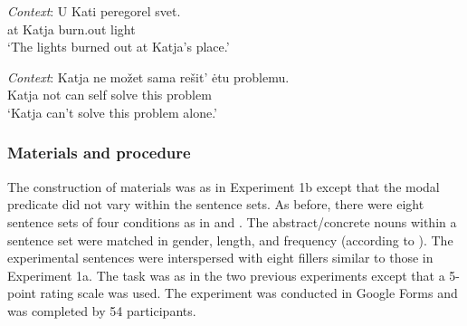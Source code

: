 \documentclass[output=paper,colorlinks,citecolor=brown]{langscibook}
\begin{document}
\ea \gll \textit{Context}: U Kati peregorel svet. \label{materials-exp2-anim}\\
{} at Katja burn.out light\\
\glt \hspace{1.3cm} `The lights burned out at Katja's place.'
\z \z

\ea \gll \textit{Context}: Katja ne možet sama rešit' ėtu problemu. \label{materials-exp2-inan}\\
{} Katja not can self solve this problem\\
\glt \hspace{1.3cm} `Katja can't solve this problem alone.'
\z\z

\subsubsection{Materials and procedure}

 The construction of materials was as in Experiment 1b except that the modal predicate did not vary within the sentence sets. As before, there were eight sentence sets of four conditions as in  and . The abstract/concrete nouns within a sentence set were matched in gender, length, and frequency (according to \citealt{Ljasevskaja.Sarov2009}). The experimental sentences were interspersed with eight fillers similar to those in Experiment 1a. The task was as in the two previous experiments except that a 5-point rating scale was used. The experiment was conducted in Google Forms and was completed by 54 participants.
\end{document}

